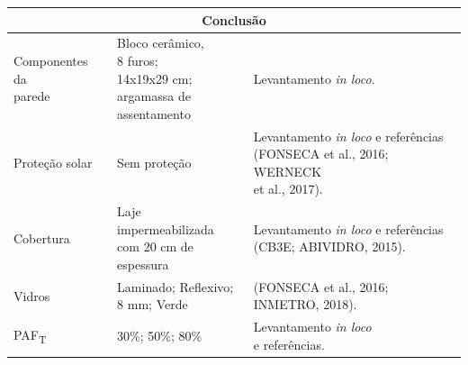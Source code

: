 \begin{table}[ht]\centering
    \begin{tabular*}{\columnwidth}{@{\extracolsep{\fill}}lll}
    \hline
    \multicolumn{3}{c}{Conclusão}\\\hline
    \makecell[l]{Componentes da\\ parede}                          & \makecell[l]{Bloco cerâmico,\\ 8 furos; \\14x19x29 cm; \\argamassa de\\ assentamento} & Levantamento \textit{in loco}.                                                                                                                                         \\ \hline
    Proteção solar                                                 & Sem proteção                                                                          & \makecell[l]{Levantamento \textit{in loco} e referências\\ (FONSECA et al., 2016; WERNECK \\et al., 2017).}                                                            \\ \hline
    Cobertura                                                      & \makecell[l]{Laje impermeabilizada\\ com 20 cm de\\ espessura}                        & \makecell[l]{Levantamento \textit{in loco} e referências \\(CB3E; ABIVIDRO, 2015).}                                                                                    \\ \hline
    Vidros                                                         & \makecell[l]{Laminado; Reflexivo;\\ 8 mm; Verde}                                      & \makecell[l]{(FONSECA et al., 2016; \\INMETRO, 2018).}                                                                                                                   \\ \hline
    PAF\textsubscript{T}                                           & 30\%; 50\%; 80\%                                                                      & \makecell[l]{Levantamento \textit{in loco}\\ e referências.}                                                                                                             \\ \hline

\end{tabular*}
\end{table}
